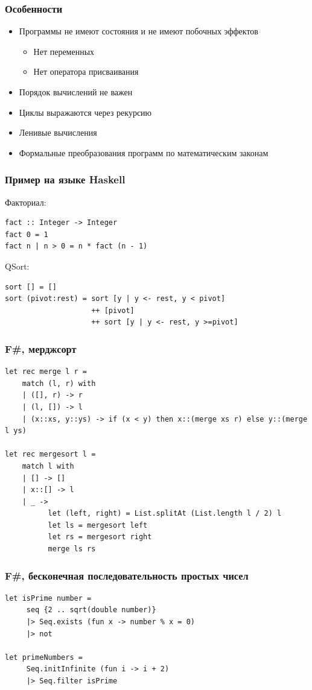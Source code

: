 \documentclass[xetex,mathserif,serif]{beamer}
\begin{document}
    \begin{frame}
        \frametitle{Особенности}
        \begin{itemize}
            \item Программы не имеют состояния и не имеют побочных эффектов
            \begin{itemize}
                \item Нет переменных
                \item Нет оператора присваивания
            \end{itemize}
            \item Порядок вычислений не важен
            \item Циклы выражаются через рекурсию
            \item Ленивые вычисления
            \item Формальные преобразования программ по математическим законам
        \end{itemize}
    \end{frame}

    \begin{frame}[fragile]
        \frametitle{Пример на языке Haskell}
        Факториал:
        \begin{verbatim}
fact :: Integer -> Integer 
fact 0 = 1 
fact n | n > 0 = n * fact (n - 1) 
        \end{verbatim}

        QSort:
        \begin{verbatim}
sort [] = [] 
sort (pivot:rest) = sort [y | y <- rest, y < pivot] 
                    ++ [pivot]
                    ++ sort [y | y <- rest, y >=pivot] 

        \end{verbatim}
    \end{frame}

    \begin{frame}[fragile]
        \frametitle{F\#, мерджсорт}
        \begin{small}
            \begin{verbatim}
let rec merge l r =
    match (l, r) with
    | ([], r) -> r
    | (l, []) -> l
    | (x::xs, y::ys) -> if (x < y) then x::(merge xs r) else y::(merge l ys)
 
let rec mergesort l = 
    match l with
    | [] -> []
    | x::[] -> l
    | _ -> 
          let (left, right) = List.splitAt (List.length l / 2) l
          let ls = mergesort left
          let rs = mergesort right
          merge ls rs
            \end{verbatim}
        \end{small}
    \end{frame}

    \begin{frame}[fragile]
        \frametitle{F\#, бесконечная последовательность простых чисел}
        \begin{verbatim}
let isPrime number =
     seq {2 .. sqrt(double number)}
     |> Seq.exists (fun x -> number % x = 0) 
     |> not

let primeNumbers =
     Seq.initInfinite (fun i -> i + 2)
     |> Seq.filter isPrime
        \end{verbatim}
    \end{frame}
\end{document}
